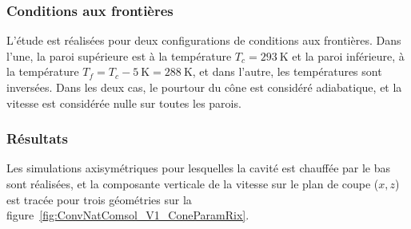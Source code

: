 \subsubsection{Conditions aux frontières}

L'étude est réalisées pour deux configurations de conditions aux frontières. Dans l'une, la paroi supérieure est à la température $T_c=\qty{293}{\kelvin}$ et la paroi inférieure, à la température $T_f=T_c-\qty{5}{\kelvin}=\qty{288}{\kelvin}$, et dans l'autre, les températures sont inversées. Dans les deux cas, le pourtour du cône est considéré adiabatique, et la vitesse est considérée nulle sur toutes les parois.

\subsubsection{Résultats}
Les simulations axisymétriques pour lesquelles la cavité est chauffée par le bas sont réalisées, et la composante verticale de la vitesse sur le plan de coupe ($x,z$) est tracée pour trois géométries sur la figure~\ref{fig:ConvNatComsol_V1_ConeParamRix}.\medskip

